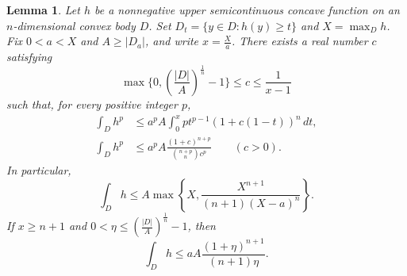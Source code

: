 \documentclass[reqno, 11pt]{article}
\numberwithin{equation}{section}
\newtheorem{lemma}[lemma]{Lemma}
\theoremstyle{definition}
\begin{document}
\begin{lemma}\label{aux:support}
Let $h$ be a nonnegative upper semicontinuous concave function on an
$n$-dimensional convex body $D$. Set $D_t=\{y\in D:h(y)\ge t\}$
and $X=\max_D h$. Fix $0<a<X$ and $A\ge |D_a|$, and write $x=\frac{X}{a}$.
There exists a real number $c$ satisfying
\[
 \max\{0,(\frac{|D|}{A})^{\frac{1}{n}}-1\}\le c\le \frac{1}{x-1}
\]
such that, for every positive integer $p$,
\begin{align}
 \int_D h^p
 &\le a^p A\int_0^x pt^{p-1}(1+c(1-t))^n\,dt ,
                         \label{eq:moment-line}\\
 \int_D h^p
 &\le a^p A\frac{(1+c)^{n+p}}{\binom{n+p}{n}c^p}
                    \qquad(c>0). \label{eq:moment-cone}
\end{align}
In particular,
\begin{equation}\label{aux:support-basic}
 \int_D h\le A\max\left\{X,\frac{X^{n+1}}{(n+1)(X-a)^n}\right\}.
\end{equation}
If $x\ge n+1$ and $0<\eta\le (\frac{|D|}{A})^{\frac{1}{n}}-1$, then
\begin{equation}\label{aux:cone}
                 \int_D h\le aA\frac{(1+\eta)^{n+1}}{(n+1)\eta}.
\end{equation}
\end{lemma}
\end{document}
